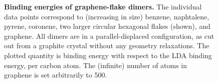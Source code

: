 \begin{figure}[t]
\caption{\textbf{Binding energies of graphene-flake dimers.}
The individual data points correspond to (increasing in size) benzene, naphtalene, pyrene, coronene, two larger circular hexagonal flakes (shown), and graphene.
All dimers are in a parallel-displaced configuration, as cut out from a graphite crystal without any geometry relaxations.
The plotted quantity is binding energy with respect to the LDA binding energy, per carbon atom.
The (infinite) number of atoms in graphene is set arbitrarily to 500.
}\label{fig:flakes}
\end{figure}

